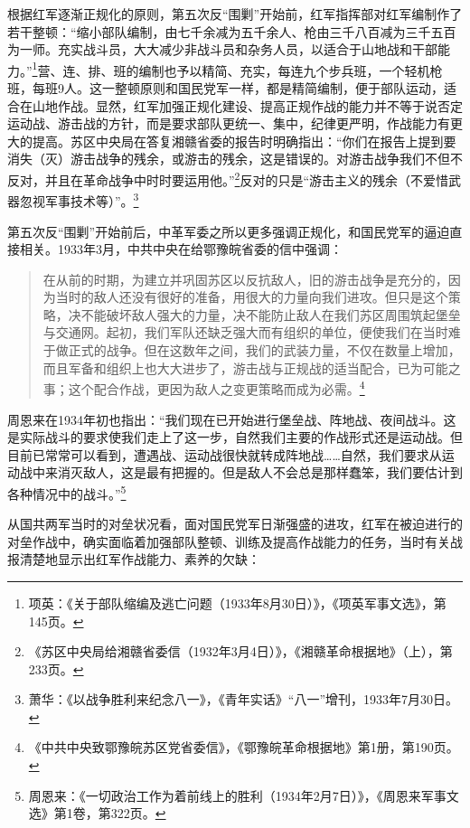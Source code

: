 根据红军逐渐正规化的原则，第五次反“围剿”开始前，红军指挥部对红军编制作了若干整顿：“缩小部队编制，由七千余减为五千余人、枪由三千八百减为三千五百为一师。充实战斗员，大大减少非战斗员和杂务人员，以适合于山地战和干部能力。”\footnote{项英：《关于部队缩编及逃亡问题（1933年8月30日）》，《项英军事文选》，第145页。}营、连、排、班的编制也予以精简、充实，每连九个步兵班，一个轻机枪班，每班9人。这一整顿原则和国民党军一样，都是精简编制，便于部队运动，适合在山地作战。显然，红军加强正规化建设、提高正规作战的能力并不等于说否定运动战、游击战的方针，而是要求部队更统一、集中，纪律更严明，作战能力有更大的提高。苏区中央局在答复湘赣省委的报告时明确指出：“你们在报告上提到要消失（灭）游击战争的残余，或游击的残余，这是错误的。对游击战争我们不但不反对，并且在革命战争中时时要运用他。”\footnote{《苏区中央局给湘赣省委信（1932年3月4日）》，《湘赣革命根据地》（上），第233页。}反对的只是“游击主义的残余（不爱惜武器忽视军事技术等）”。\footnote{萧华：《以战争胜利来纪念八一》，《青年实话》“八一”增刊，1933年7月30日。}


第五次反“围剿”开始前后，中革军委之所以更多强调正规化，和国民党军的逼迫直接相关。1933年3月，中共中央在给鄂豫皖省委的信中强调：

\begin{quote}

在从前的时期，为建立并巩固苏区以反抗敌人，旧的游击战争是充分的，因为当时的敌人还没有很好的准备，用很大的力量向我们进攻。但只是这个策略，决不能破坏敌人强大的力量，决不能防止敌人在我们苏区周围筑起堡垒与交通网。起初，我们军队还缺乏强大而有组织的单位，便使我们在当时难于做正式的战争。但在这数年之间，我们的武装力量，不仅在数量上增加，而且军备和组织上也大大进步了，游击战与正规战的适当配合，已为可能之事；这个配合作战，更因为敌人之变更策略而成为必需。\footnote{《中共中央致鄂豫皖苏区党省委信》，《鄂豫皖革命根据地》第1册，第190页。}
\end{quote}


周恩来在1934年初也指出：“我们现在已开始进行堡垒战、阵地战、夜间战斗。这是实际战斗的要求使我们走上了这一步，自然我们主要的作战形式还是运动战。但目前已常常可以看到，遭遇战、运动战很快就转成阵地战……自然，我们要求从运动战中来消灭敌人，这是最有把握的。但是敌人不会总是那样蠢笨，我们要估计到各种情况中的战斗。”\footnote{周恩来：《一切政治工作为着前线上的胜利（1934年2月7日）》，《周恩来军事文选》第1卷，第322页。}


从国共两军当时的对垒状况看，面对国民党军日渐强盛的进攻，红军在被迫进行的对垒作战中，确实面临着加强部队整顿、训练及提高作战能力的任务，当时有关战报清楚地显示出红军作战能力、素养的欠缺：

